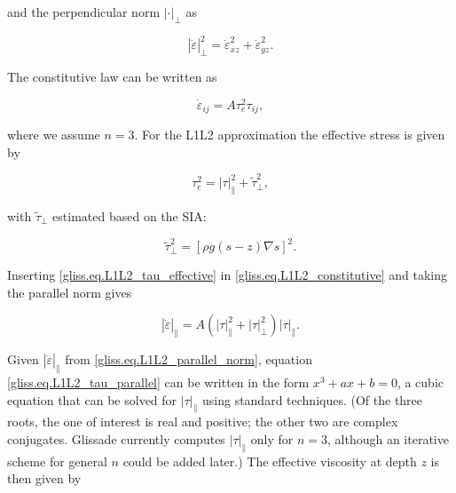 {\noindent
and the perpendicular norm $\left| \cdot \right|_{\perp}$ as

\begin{equation}
  \label{gliss.eq.L1L2_perp_norm}
  \left| {\dot{\varepsilon }} \right|_{\perp}^{2} = 
  \dot{\varepsilon }_{xz}^{2} + \dot{\varepsilon }_{yz}^{2}.
\end{equation}

\noindent
The constitutive law can be written as 

\begin{equation}
  \label{gliss.eq.L1L2_constitutive}
  {{\dot{\varepsilon }}_{ij}} = A \tau _{e}^{2} {{\tau }_{ij}},
\end{equation}

\noindent
where we assume $n=3$.  For the L1L2 approximation the effective stress is given by

\begin{equation}
  \label{gliss.eq.L1L2_tau_effective}
  \tau _{e}^{2} = \left| \tau  \right|_{\parallel }^{2} + \tilde{\tau}_{\perp}^2,
\end{equation}

\noindent
with $\tilde{\tau}_{\perp}$ estimated based on the SIA:

\begin{equation}
  \label{gliss.eq.L1L2_tau_perp}
  \tilde{\tau}_{\perp}^{2} = {\left[ \rho g(s-z)\nabla s \right]}^2.
\end{equation}

\noindent
Inserting \eqref{gliss.eq.L1L2_tau_effective} in \eqref{gliss.eq.L1L2_constitutive} and taking 
the parallel norm gives

\begin{equation}
  \label{gliss.eq.L1L2_tau_parallel}
        {\left| {\dot{\varepsilon }} \right|}_{\parallel}
        = A (\left| \tau \right|_{\parallel}^{2} + \left| \tau \right|_{\perp}^{2}) {{\left| \tau \right|}_{\parallel}}.
\end{equation}

\noindent
Given ${\left| {\dot{\varepsilon }} \right|}_{\parallel}$ from \eqref{gliss.eq.L1L2_parallel_norm},
equation \eqref{gliss.eq.L1L2_tau_parallel} can be written in the form $x^3 + a x + b = 0$,
a cubic equation that can be solved for ${\left| \tau \right|}_{\parallel}$ using standard techniques.
(Of the three roots, the one of interest is real and positive; the other two are complex conjugates.
Glissade currently computes ${\left| \tau \right|}_{\parallel}$ only for $n = 3$,
although an iterative scheme for general $n$ could be added later.)
The effective viscosity at depth $z$ is then given by

}
